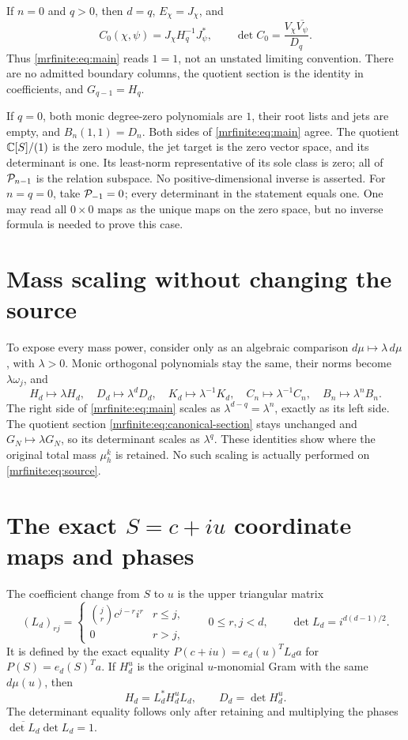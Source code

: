 \documentclass[11pt]{article}
\begin{document}
If \(n=0\) and \(q>0\), then \(d=q\), \(E_\chi=J_\chi\), and
\[
 C_0(\chi,\psi)=J_\chi H_q^{-1}J_\psi^*,\qquad
 \det C_0=\frac{V_\chi\overline{V_\psi}}{D_q}.
\]
Thus \eqref{mrfinite:eq:main} reads \(1=1\), not an unstated limiting convention.
There are no admitted boundary columns, the quotient section is the
identity in coefficients, and \(G_{q-1}=H_q\).

If \(q=0\), both monic degree-zero polynomials are \(1\), their root
lists and jets are empty, and \(B_n(1,1)=D_n\). Both sides of
\eqref{mrfinite:eq:main} agree. The quotient \(\mathbb C[S]/(1)\) is the zero module,
the jet target is the zero vector space, and its determinant is one.
Its least-norm representative of its sole class is zero; all of
\(\mathcal P_{n-1}\) is the relation subspace. No positive-dimensional inverse
is asserted. For \(n=q=0\), take \(\mathcal P_{-1}=0\); every determinant in
the statement equals one. One may read all \(0\times0\) maps as the
unique maps on the zero space, but no inverse formula is needed to prove
this case.

\section{Mass scaling without changing the source}\label{mrfinite:sec:mass}

To expose every mass power, consider only as an algebraic comparison
\(d\mu\mapsto\lambda\,d\mu\), with \(\lambda>0\). Monic
orthogonal polynomials stay the same, their norms become
\(\lambda\omega_j\), and
\[
 H_d\mapsto\lambda H_d,\quad D_d\mapsto\lambda^dD_d,
 \quad K_d\mapsto\lambda^{-1}K_d,\quad
 C_n\mapsto\lambda^{-1}C_n,\quad B_n\mapsto\lambda^nB_n.
\]
The right side of \eqref{mrfinite:eq:main} scales as
\(\lambda^{d-q}=\lambda^n\), exactly as its left side.
The quotient section \eqref{mrfinite:eq:canonical-section} stays unchanged and
\(G_N\mapsto\lambda G_N\), so its determinant scales as
\(\lambda^q\). These identities show where the original total mass
\(\mu_h^k\) is retained. No such scaling is actually performed on
\eqref{mrfinite:eq:source}.

\section{The exact \(S=c+iu\) coordinate maps and phases}\label{mrfinite:sec:phases}

The coefficient change from \(S\) to \(u\) is the upper triangular
matrix
\[
 (L_d)_{rj}=\begin{cases}\binom jr c^{j-r}i^r&r\leq j,\\0&r>j,
 \end{cases}
 \qquad 0\leq r,j<d,
 \qquad\det L_d=i^{d(d-1)/2}.
\]
It is defined by the exact equality
\(P(c+iu)=e_d(u)^TL_da\) for \(P(S)=e_d(S)^Ta\).
If \(H_d^{u}\) is the original \(u\)-monomial Gram with the same
\(d\mu(u)\), then
\begin{equation}\label{mrfinite:eq:coordinategram}
 H_d=L_d^*H_d^{u}L_d,\qquad D_d=\det H_d^{u}.
\end{equation}
The determinant equality follows only after retaining and multiplying
the phases \(\overline{\det L_d}\det L_d=1\).
\end{document}
